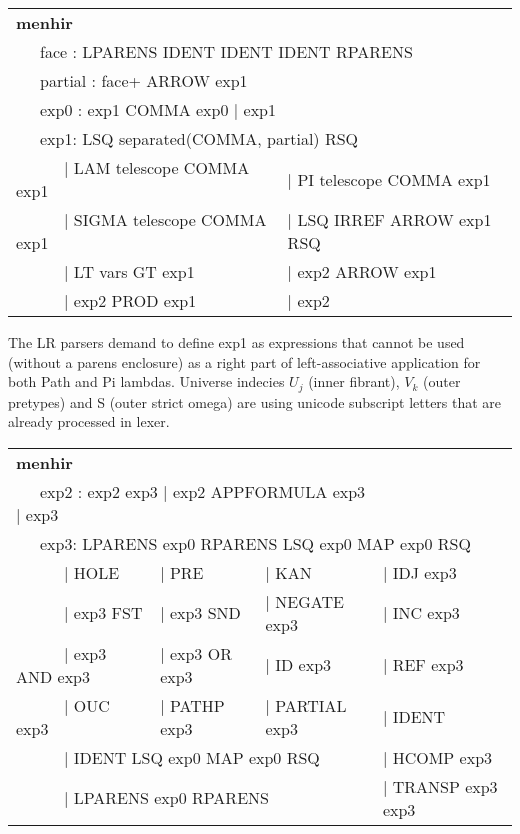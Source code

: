 \documentclass[a4paper,UKenglish,cleveref, autoref, thm-restate]{lipics-v2021}
\begin{document}
\begin{table}[ht]
\begin{tabular}{ll}
\textbf{menhir} \\
\multicolumn{2}{l}{\ \ \ face : LPARENS IDENT IDENT IDENT RPARENS } \\
\multicolumn{2}{l}{\ \ \ partial : face+ ARROW exp1 } \\
\multicolumn{2}{l}{\ \ \ exp0 : exp1 COMMA exp0 | exp1 } \\
\multicolumn{2}{l}{\ \ \ exp1: LSQ separated(COMMA, partial) RSQ } \\
\ \ \ \ \ \ | LAM telescope COMMA exp1   & | PI telescope COMMA exp1 \\
\ \ \ \ \ \ | SIGMA telescope COMMA exp1 & | LSQ IRREF ARROW exp1 RSQ \\
\ \ \ \ \ \ | LT vars GT exp1            & | exp2 ARROW exp1 \\
\ \ \ \ \ \ | exp2 PROD exp1             & | exp2 \\
\end{tabular}
\end{table}

The LR parsers demand to define exp1 as expressions that cannot be used (without a parens enclosure) as a right part of left-associative application for both Path and Pi lambdas.
Universe indecies $U_j$ (inner fibrant), $V_k$ (outer pretypes) and S (outer strict omega) are using unicode subscript letters that are already processed in lexer.

\begin{table}[ht!]
\begin{tabular}{llll}
\textbf{menhir} \\
\multicolumn{3}{l}{\ \ \ exp2 : exp2 exp3 | exp2 APPFORMULA exp3 | exp3 } \\
\multicolumn{4}{l}{\ \ \ exp3: LPARENS exp0 RPARENS LSQ exp0 MAP exp0 RSQ } \\
\ \ \ \ \ \   | HOLE              & | PRE          & | KAN          & | IDJ exp3 \\
\ \ \ \ \ \   | exp3 FST          & | exp3 SND     & | NEGATE exp3  & | INC exp3 \\
\ \ \ \ \ \   | exp3 AND exp3     & | exp3 OR exp3 & | ID exp3      & | REF exp3\\
\ \ \ \ \ \   | OUC exp3          & | PATHP exp3   & | PARTIAL exp3 & | IDENT \\
\multicolumn{3}{l}{\ \ \ \ \ \    | IDENT LSQ exp0 MAP exp0 RSQ }   & | HCOMP exp3 \\
\multicolumn{3}{l}{\ \ \ \ \ \    | LPARENS exp0 RPARENS }          & | TRANSP exp3 exp3 \\
\end{tabular}
\end{table}
\end{document}
